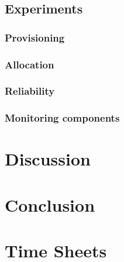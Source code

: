\documentclass[a4paper]{IEEEtran}
\begin{document}

\subsection{Experiments}
\subsubsection{Provisioning}

\subsubsection{Allocation}

\subsubsection{Reliability}

\subsubsection{Monitoring components}


\section{Discussion}

\section{Conclusion}





\appendix
\section{Time Sheets}
\end{document}

